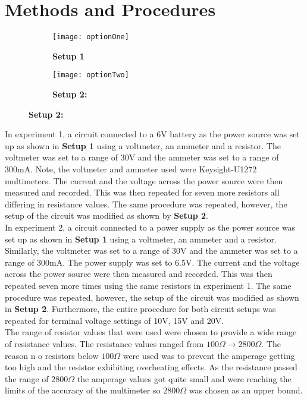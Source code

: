 \documentclass[
	letterpaper, %
	10pt, %
]{CSUniSchoolLabReport}
\begin{document}
\section{Methods and Procedures}
\begin{figure}[H]
    \centering
	\begin{subfigure}{0.45\textwidth}
		\texttt{[image: optionOne]}
		\caption{\textbf{Setup 1}}
	\end{subfigure}
	\begin{subfigure}{0.45\textwidth}
		\texttt{[image: optionTwo]}
		\caption{\textbf{Setup 2:}}
	\end{subfigure}
\end{figure}

In experiment 1, a circuit connected to a 6V battery as the power source was set up as shown in \textbf{Setup 1} using a voltmeter, an ammeter and a resistor. The voltmeter was set to a range of 30V and the ammeter was set to a range of 300mA. Note, the voltmeter and ammeter used were Keysight-U1272 multimeters. The current and the voltage across the power source were then measured and recorded. This was then repeated for seven more resistors all differing in resistance values. The same procedure was repeated, however, the setup of the circuit was modified as shown by \textbf{Setup 2}.\\

In experiment 2, a circuit connected to a power supply as the power source was set up as shown in \textbf{Setup 1} using a voltmeter, an ammeter and a resistor. Similarly, the voltmeter was set to a range of 30V and the ammeter was set to a range of 300mA. The power supply was set to 6.5V. The current and the voltage across the power source were then measured and recorded. This was then repeated seven more times using the same resistors in experiment 1. The same procedure was repeated, however, the setup of the circuit was modified as shown in \textbf{Setup 2}.  Furthermore, the entire procedure for both circuit setups was repeated for terminal voltage settings of 10V, 15V and 20V. \\

The range of resistor values that were used were chosen to provide a wide range of resistance values. The
resistance values ranged from $100\Omega\rightarrow 2800\Omega$. The reason n o resistors below $100\Omega$ were used was to prevent the amperage getting
too high and the resistor exhibiting overheating effects. As the resistance passed the range of $2800\Omega$ the
amperage values got quite small and were reaching the limits of the accuracy of the multimeter so $2800\Omega$
was chosen as an upper bound.\\
\end{document}
